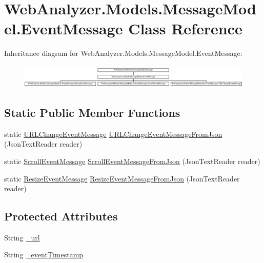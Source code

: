 \hypertarget{class_web_analyzer_1_1_models_1_1_message_model_1_1_event_message}{}\section{Web\+Analyzer.\+Models.\+Message\+Model.\+Event\+Message Class Reference}
\label{class_web_analyzer_1_1_models_1_1_message_model_1_1_event_message}
Inheritance diagram for Web\+Analyzer.\+Models.\+Message\+Model.\+Event\+Message\+:\begin{figure}[H]
\begin{center}
\leavevmode
\includegraphics[height=1.138211cm]{class_web_analyzer_1_1_models_1_1_message_model_1_1_event_message}
\end{center}
\end{figure}
\subsection*{Static Public Member Functions}
\begin{DoxyCompactItemize}
\item 
static \hyperlink{class_web_analyzer_1_1_models_1_1_message_model_1_1_in_1_1_event_messages_1_1_u_r_l_change_event_message}{U\+R\+L\+Change\+Event\+Message} \hyperlink{class_web_analyzer_1_1_models_1_1_message_model_1_1_event_message_a971a2b704c5e6ef67a48b2836d53fccb}{U\+R\+L\+Change\+Event\+Message\+From\+Json} (Json\+Text\+Reader reader)
\item 
static \hyperlink{class_web_analyzer_1_1_models_1_1_message_model_1_1_in_1_1_event_messages_1_1_scroll_event_message}{Scroll\+Event\+Message} \hyperlink{class_web_analyzer_1_1_models_1_1_message_model_1_1_event_message_a3c2e13ff9e1eba07492ee1406814077d}{Scroll\+Event\+Message\+From\+Json} (Json\+Text\+Reader reader)
\item 
static \hyperlink{class_web_analyzer_1_1_models_1_1_message_model_1_1_in_1_1_event_messages_1_1_resize_event_message}{Resize\+Event\+Message} \hyperlink{class_web_analyzer_1_1_models_1_1_message_model_1_1_event_message_af72ae6f9dc1fec4f1c9ea68a90643be7}{Resize\+Event\+Message\+From\+Json} (Json\+Text\+Reader reader)
\end{DoxyCompactItemize}
\subsection*{Protected Attributes}
\begin{DoxyCompactItemize}
\item 
String \hyperlink{class_web_analyzer_1_1_models_1_1_message_model_1_1_event_message_aef3ed320a568084cd131451ccc71fc8b}{\+\_\+url}
\item 
String \hyperlink{class_web_analyzer_1_1_models_1_1_message_model_1_1_event_message_a48a2a6f84fb71c7083b757af773fc183}{\+\_\+event\+Timestamp}
\end{DoxyCompactItemize}
